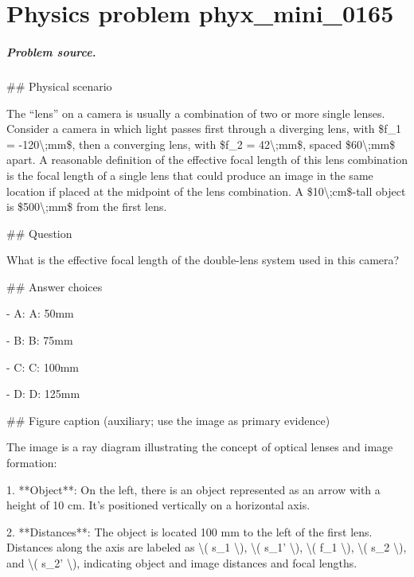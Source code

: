 
\chapter{Physics problem phyx\_mini\_0165}
\label{ch:PhyXMiniProblems_problem_phyx_mini_0165}

\paragraph{Problem source.}
\#\# Physical scenario

The ``lens'' on a camera is usually a combination of two or more single lenses. Consider a camera in which light passes first through a diverging lens, with \$f\_1 = -120\textbackslash{};mm\$, then a converging lens, with \$f\_2 = 42\textbackslash{};mm\$, spaced \$60\textbackslash{};mm\$ apart. A reasonable definition of the effective focal length of this lens combination is the focal length of a single lens that could produce an image in the same location if placed at the midpoint of the lens combination. A \$10\textbackslash{};cm\$-tall object is \$500\textbackslash{};mm\$ from the first lens.

\#\# Question

What is the effective focal length of the double-lens system used in this camera?

\#\# Answer choices

- A: A: 50mm

- B: B: 75mm

- C: C: 100mm

- D: D: 125mm

\#\# Figure caption (auxiliary; use the image as primary evidence)

The image is a ray diagram illustrating the concept of optical lenses and image formation:

1. **Object**: On the left, there is an object represented as an arrow with a height of 10 cm. It's positioned vertically on a horizontal axis.

2. **Distances**: The object is located 100 mm to the left of the first lens. Distances along the axis are labeled as \textbackslash{}( s\_1 \textbackslash{}), \textbackslash{}( s\_1' \textbackslash{}), \textbackslash{}( f\_1 \textbackslash{}), \textbackslash{}( s\_2 \textbackslash{}), and \textbackslash{}( s\_2' \textbackslash{}), indicating object and image distances and focal lengths.

